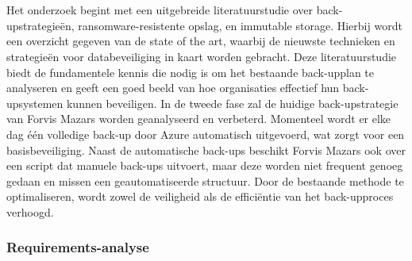 
\chapter{}%
\label{ch:methodologie}


Het onderzoek begint met een uitgebreide literatuurstudie over back-upstrategieën, ransomware-resistente opslag, en immutable storage. Hierbij wordt een overzicht gegeven van de state of the art, waarbij de nieuwste technieken en strategieën voor databeveiliging in kaart worden gebracht. Deze literatuurstudie biedt de fundamentele kennis die nodig is om het bestaande back-upplan te analyseren en geeft een goed beeld van hoe organisaties effectief hun back-upsystemen kunnen beveiligen. In de tweede fase zal de huidige back-upstrategie van Forvis Mazars worden geanalyseerd en verbeterd. Momenteel wordt er elke dag één volledige back-up door Azure automatisch uitgevoerd, wat zorgt voor een basisbeveiliging. Naast de automatische back-ups beschikt Forvis Mazars ook over een script dat manuele back-ups uitvoert, maar deze worden niet frequent genoeg gedaan en missen een geautomatiseerde structuur. Door de bestaande methode te optimaliseren, wordt zowel de veiligheid als de efficiëntie van het back-upproces verhoogd.
\subsection{Requirements-analyse}
